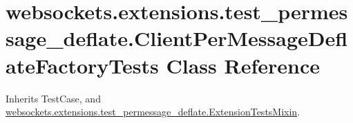 \hypertarget{classwebsockets_1_1extensions_1_1test__permessage__deflate_1_1_client_per_message_deflate_factory_tests}{}\section{websockets.\+extensions.\+test\+\_\+permessage\+\_\+deflate.\+Client\+Per\+Message\+Deflate\+Factory\+Tests Class Reference}
\label{classwebsockets_1_1extensions_1_1test__permessage__deflate_1_1_client_per_message_deflate_factory_tests}


Inherits Test\+Case, and \hyperlink{classwebsockets_1_1extensions_1_1test__permessage__deflate_1_1_extension_tests_mixin}{websockets.\+extensions.\+test\+\_\+permessage\+\_\+deflate.\+Extension\+Tests\+Mixin}.

